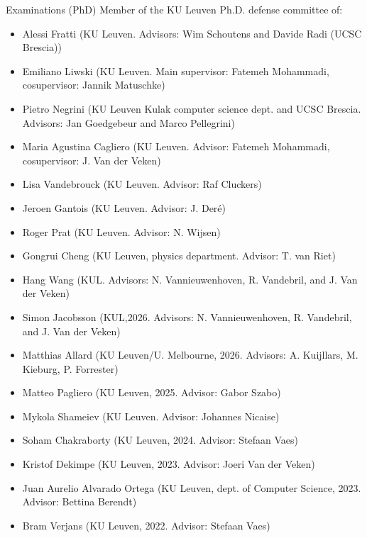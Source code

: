 \documentclass[12p]{resume}
\begin{document}
\begin{category}{Examinations (PhD)}
\citemnobullet 
 Member of the KU Leuven Ph.D. defense committee of:
\begin{itemize}
\item Alessi Fratti (KU Leuven. Advisors: Wim Schoutens and Davide Radi (UCSC Brescia))
\item Emiliano Liwski (KU Leuven. Main supervisor: Fatemeh Mohammadi, cosupervisor: Jannik Matuschke) %
\item Pietro Negrini (KU Leuven Kulak computer science dept. and UCSC Brescia. Advisors: Jan Goedgebeur and Marco Pellegrini)
\item Maria Agustina Cagliero (KU Leuven. Advisor: Fatemeh Mohammadi, cosupervisor:  J. Van der Veken)
\item Lisa Vandebrouck (KU Leuven. Advisor:  Raf Cluckers)
\item Jeroen Gantois (KU Leuven. Advisor: J. Der\'e)
\item Roger Prat (KU Leuven. Advisor: N. Wijsen)
\item Gongrui Cheng (KU Leuven, physics department. Advisor: T. van Riet) 
\item Hang Wang (KUL. Advisors:  N. Vannieuwenhoven, R. Vandebril, and J. Van der Veken)
\item Simon Jacobsson (KUL,2026. Advisors:  N. Vannieuwenhoven, R. Vandebril, and J. Van der Veken)
\item Matthias Allard (KU Leuven/U. Melbourne, 2026. Advisors:  A. Kuijllars, M. Kieburg, P. Forrester)
\item Matteo Pagliero (KU Leuven, 2025. Advisor:  Gabor Szabo)
\item Mykola Shameiev (KU Leuven. Advisor:  Johannes Nicaise)
\item Soham Chakraborty (KU Leuven, 2024. Advisor:  Stefaan Vaes)
\item Kristof Dekimpe (KU Leuven, 2023. Advisor:  Joeri Van der Veken)
\item Juan Aurelio Alvarado Ortega (KU Leuven, dept. of Computer Science, 2023. Advisor:  Bettina Berendt)
\item Bram Verjans (KU Leuven, 2022. Advisor:  Stefaan Vaes)

\end{itemize}
\end{category}
\end{document}
